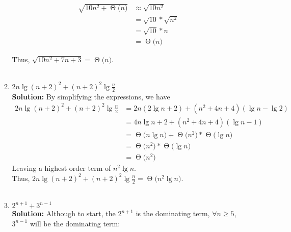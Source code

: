 \documentclass[11pts]{article}
\newcommand{\BigTheta}[1]{\ensuremath{\operatorname{\Theta}\bigl(#1\bigr)}}
\begin{document}
\begin{enumerate}
\begin{enumerate}
        \begin{align*}
          \sqrt{10n^2 + \BigTheta{n}} &\approx \sqrt{10n^{2}}  \\
                                      &= \sqrt{10} * \sqrt{n^{2}} \\
                                      &= \sqrt{10} * n \\
                                      &= \BigTheta{n}
        \end{align*}

       Thus, $ \sqrt{10n^{2}+7n+3} = \BigTheta{n}$.\\
       \\

      \item $ 2n\lg{(n+2)^{2}}+(n+2)^{2}\lg{\frac{n}{2}} $ \\

        \textbf{Solution:} By simplifying the expressions, we have
        \begin{align*}
          2n\lg{(n+2)^{2}}+(n+2)^{2}\lg{\frac{n}{2}}
              &= 2n(2\lg{n + 2}) + (n^{2} + 4n + 4)(\lg{n} - \lg{2}) \\
          &= 4n\lg{n + 2} + (n^{2} + 4n + 4)(\lg{n} - 1) \\
          &= \BigTheta{n\lg{n}} + \BigTheta{n^{2}} * \BigTheta{\lg{n}} \\
          &= \BigTheta{n^{2}} * \BigTheta{\lg{n}} \\
          &= \BigTheta{n^{2}}
        \end{align*}
        Leaving a highest order term of $n^{2}\lg{n}$.\\
        Thus, $ 2n\lg{(n+2)^{2}}+(n+2)^{2}\lg{\frac{n}{2}}
            = \BigTheta{n^{2}\lg{n}} $.\\
      \\

      \item $ 2^{n+1}+3^{n-1} $ \\

        \textbf{Solution:} Although to start, the $2^{n+1}$ is the dominating
        term, $ \forall n \ge 5 $, $ 3^{n-1} $ will be the dominating term: \\


\end{enumerate}
\end{enumerate}
\end{document}
